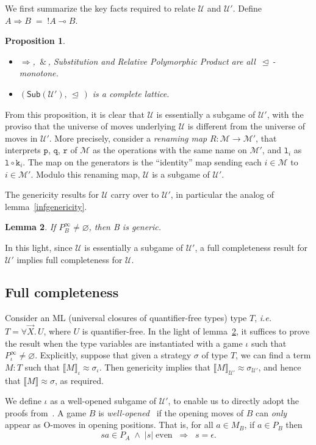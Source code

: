 \documentclass[a4paper,11pt]{article}
\newcommand{\gequiv}{\approx}
\newcommand{\lsem}{\llbracket}
\newcommand{\rsem}{\rrbracket}
\newcommand{\UU}{\mathcal{U}}
\newtheorem{proposition}{Proposition}[section]
\newtheorem{lemma}[proposition]{Lemma}
\newcommand{\llwith}{\, \& \,}
\newcommand{\ginc}{\, \trianglelefteq \,}
\newcommand{\ie}{\textit{i.e.}\ }
\newcommand{\al}{\mathtt{p}}
\newcommand{\ar}{\mathtt{q}}
\newcommand{\fr}{\mathtt{r}}
\newcommand{\fl}[1]{\mathtt{l}_{#1}}
\newcommand{\MM}{\mathcal{M}}
\newcommand{\bangindex}[1]{\mathtt{k}_{#1}}
\newcommand{\linearfl}{\mathtt{l}}
\newcommand{\linimpl}{\multimap}
\newcommand{\LUU}{\mathcal{U'}}
\newcommand{\SubLU}{\mathsf{Sub}(\LUU )}
\newcommand{\linearMM}{\mathcal{M'}}
\begin{document}
We first summarize the key facts required to relate $\UU$ and
$\LUU$.  Define $A \Rightarrow B \; = \; {!A \linimpl B}$.
\begin{proposition} \hfill
\begin{itemize}
\item  $\Rightarrow$, $\llwith$, Substitution and Relative Polymorphic
Product are all $\ginc$-monotone.
\item $(\SubLU, \ginc )$ is a complete lattice.
\end{itemize}
\end{proposition}
From this proposition, it is clear that $\UU$ is essentially a
subgame of $\LUU$, with the proviso that the universe of moves
underlying $\UU$ is different from the universe of moves in
$\LUU$.  More precisely, consider a \emph{renaming map} $R: \MM
\longrightarrow \linearMM$, that interprets $\al$, $\ar$, $\fr$ of
$\MM$ as the operations with the same name on $\linearMM$, and
$\fl{i}$ as $\linearfl \circ \bangindex{i}$. The map on the
generators is the ``identity'' map sending each $i \in \MM$ to $i
\in \linearMM$. Modulo this renaming map, $\UU$ is a subgame of
$\LUU$.

The genericity results for $\UU$ carry over to $\LUU$, in
particular the analog of lemma~\ref{infgenericity}.
\begin{lemma}\label{LUUgenericity} If
$P_B^{\infty} \neq \varnothing$, then B is generic.
\end{lemma}
In this light, since $\UU$ is essentially a subgame of $\LUU$, a
full completeness result for $\LUU$ implies full completeness for
$\UU$.

\subsection{Full completeness}


Consider an ML (universal closures of quantifier-free types) type
$T$, \ie $T = \forall \vec{X}. \, U$, where $U$ is quantifier-free.  
In the light of lemma~\ref{LUUgenericity}, it suffices to
prove the result when the type variables are instantiated with a
game $\iota$ such that $P_{\iota}^{\infty} \neq
\varnothing$. Explicitly, suppose that given a strategy $\sigma$ of
type $T$, we can find a term $M : T$ such that $\lsem M \rsem_{\iota}
\gequiv \sigma_{\iota}$. Then genericity implies that $\lsem M \rsem_{\LUU}
\gequiv \sigma_{\LUU}$, and hence that $\lsem M \rsem \gequiv \sigma$, as required.

We define $\iota$ as a well-opened subgame of $\LUU$, to enable us
to directly adopt the proofs from~\cite{AJM00}.  A game $B$ is
{\em well-opened}~\cite{AJM00} if the opening moves of $B$ can
\emph{only} appear as O-moves in opening positions. That is, for all 
$a\in M_B$, if
$a\in P_B$ then
\[ sa\in P_A \; \wedge \; | s |\; \mbox{even} \;\; \Longrightarrow \;\; 
s=\epsilon . \]
\end{document}
